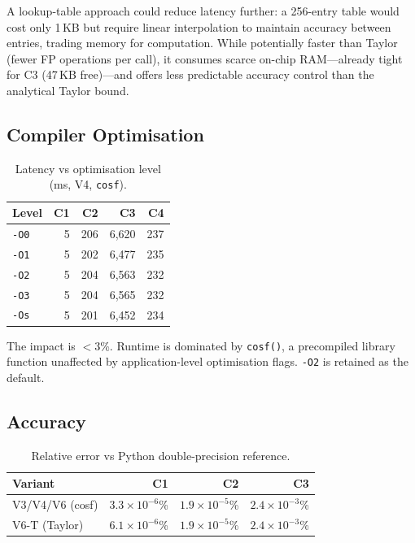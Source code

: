 \documentclass[a4paper,10pt,twocolumn]{article}
\begin{document}
A lookup-table approach could reduce latency further: a 256-entry table
would cost only 1\,KB but require linear interpolation to maintain
accuracy between entries, trading memory for computation.
While potentially faster than Taylor (fewer FP operations per call),
it consumes scarce on-chip RAM---already tight for C3 (47\,KB free)---and
offers less predictable accuracy control than the analytical Taylor bound.

\subsection{Compiler Optimisation}

\begin{table}[H]
\centering
\caption{Latency vs optimisation level (ms, V4, \texttt{cosf}).}
\label{tab:opt_level}
\small
\begin{tabular}{lrrrr}
\toprule
Level & C1 & C2 & C3 & C4 \\
\midrule
\texttt{-O0} & 5 & 206 & 6{,}620 & 237 \\
\texttt{-O1} & 5 & 202 & 6{,}477 & 235 \\
\texttt{-O2} & 5 & 204 & 6{,}563 & 232 \\
\texttt{-O3} & 5 & 204 & 6{,}565 & 232 \\
\texttt{-Os} & 5 & 201 & 6{,}452 & 234 \\
\bottomrule
\end{tabular}
\end{table}

The impact is $<$3\%.
Runtime is dominated by \texttt{cosf()}, a precompiled library function unaffected by application-level optimisation flags.
\texttt{-O2} is retained as the default.

\subsection{Accuracy}

\begin{table}[H]
\centering
\caption{Relative error vs Python double-precision reference.}
\label{tab:accuracy}
\small
\begin{tabular}{lrrr}
\toprule
Variant & C1 & C2 & C3 \\
\midrule
V3/V4/V6 (cosf) & $3.3\!\times\!10^{-6}$\% & $1.9\!\times\!10^{-5}$\% & $2.4\!\times\!10^{-3}$\% \\
V6-T (Taylor)    & $6.1\!\times\!10^{-6}$\% & $1.9\!\times\!10^{-5}$\% & $2.4\!\times\!10^{-3}$\% \\
\bottomrule
\end{tabular}
\end{table}
\end{document}
